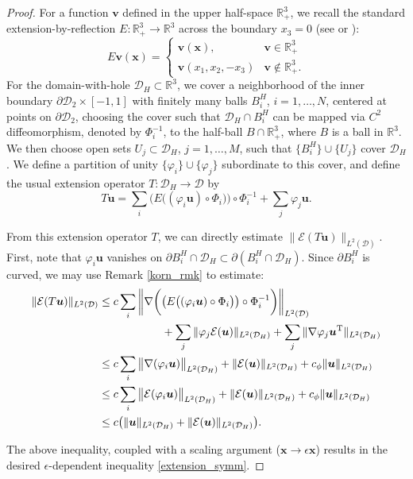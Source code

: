 \documentclass[11pt]{article}
\numberwithin{equation}{section}
\newcommand{\R}{\mathbb{R}}
\newcommand{\E}{\mathcal{E}}
\newcommand{\D}{\mathcal{D}}
\newcommand{\bu}{\bm{u}}
\newcommand{\bx}{\bm{x}}
\newcommand{\bv}{\bm{v}}
\newcommand{\p}{\partial}
\newcommand{\norm}[1]{\left\lVert #1 \right\rVert}
\theoremstyle{definition}
\begin{document}
\begin{proof}
For a function $\bv$ defined in the upper half-space $\R^3_+$, we recall the standard extension-by-reflection $E:\R^3_+\to \R^3$ across the boundary $x_3=0$ (see \cite{mazya1997differentiable} or \cite{evans2010pde}):
\[ E\bv(\bx) = \begin{cases}
\bv(\bx), & \bv\in \R^3_+ \\
\bv(x_1,x_2,-x_3) & \bv \not\in \R^3_+.
\end{cases} \]
For the domain-with-hole $\D_H\subset \R^3$, we cover a neighborhood of the inner boundary $\p\D_2\times [-1,1]$ with finitely many balls $B^H_i$, $i=1, \dots,N$, centered at points on $\p\D_2$, choosing the cover such that $\D_H\cap B^H_i$ can be mapped via $C^2$ diffeomorphism, denoted by $\Phi^{-1}_i$, to the half-ball $B\cap\R^3_+$, where $B$ is a ball in $\R^3$. We then choose open sets $U_j\subset\D_H$, $j=1,\dots,M$, such that $\{ B^H_i\} \cup \{U_j\}$ cover $\D_H$.  We define a partition of unity $\{\varphi_i\}\cup \{\varphi_j\}$ subordinate to this cover, and define the usual extension operator $T:\D_H\to \D$ by
\[T\bu = \sum_i \bigg(E\big((\varphi_i \bu)\circ \Phi_i\big)\bigg)\circ \Phi_i^{-1} + \sum_j \varphi_j \bu.\]

From this extension operator $T$, we can directly estimate $\|\E(T\bu)\|_{L^2(\D)}$. First, note that $\varphi_i \bu$ vanishes on $\p B_i^H \cap \D_H\subset \p(B_i^H\cap\D_H)$. Since $\p B_i^H$ is curved, we may use Remark \ref{korn_rmk} to estimate: 
\begin{align*}
\|\E(T\bu)\|_{L^2(\D)} &\le c\sum_i\norm{\nabla\bigg(\big(E\big((\varphi_i \bu)\circ \Phi_i\big)\big)\circ \Phi_i^{-1}\bigg) }_{L^2(\D)} \\
&\hspace{2cm} +\sum_j \|\varphi_j\E(\bu) \|_{L^2(\D_H)} + \sum_j \|\nabla \varphi_j \bu^{\rm T} \|_{L^2(\D_H)}\\
%
&\le c\sum_i\big\|\nabla(\varphi_i \bu)\big\|_{L^2(\D_H)} + \|\E(\bu)\|_{L^2(\D_H)} + c_{\phi}\|\bu\|_{L^2(\D_H)} \\
&\le c\sum_i\big\|\E(\varphi_i \bu) \big\|_{L^2(\D_H)} + \|\E(\bu)\|_{L^2(\D_H)} + c_{\phi}\|\bu\|_{L^2(\D_H)} \\
&\le c\big( \|\bu\|_{L^2(\D_H)} + \|\E(\bu)\|_{L^2(\D_H)} \big).
\end{align*}

The above inequality, coupled with a scaling argument ($\bx\to \epsilon\bx$) results in the desired $\epsilon$-dependent inequality \eqref{extension_symm}.
 \end{proof}
 
\end{document}
